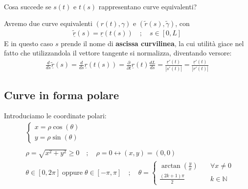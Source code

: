 Cosa succede se $s(t)$ e $t(s)$ rappresentano curve equivalenti?

Avremo due curve equivalenti $(r(t),\gamma)$ e $(\tilde{r}(s),\tilde{\gamma})$, con
\begin{align}
\tilde{\underline{r}}(s)=\underline{r}(t(s)) \quad ; \quad s \in [0,L]
\end{align}
E in questo caso $s$ prende il nome di \textbf{ascissa curvilinea}, la cui utilità giace nel fatto che utilizzandola il vettore tangente si normalizza, diventando versore:
\begin{align}
\frac{d}{ds}\tilde{\underline{r}}(s)= \frac{d}{ds}\underline{r}(t(s))= \frac{\partial}{\partial t}\underline{r}(t) \frac{dL}{ds}= \frac{\underline{r}'(t)}{|s'(t)|}=\frac{\underline{r}'(t)}{|r'(t)|}
\end{align}

\subsection{Curve in forma polare}

Introduciamo le coordinate polari:
\begin{align}
{}&\left\{
\begin{array}{cc}
x=\rho \cos(\theta)\\
y=\rho \sin(\theta)
\end{array}
\right.\\
\nonumber \\
&\rho=\sqrt{x^2 + y^2} \geq 0 \quad ;\quad \rho=0\leftrightarrow (x,y)=(0,0) \\
&\theta \in [0,2\pi] \; \text{oppure} \; \theta \in [-\pi,\pi] \quad ; \quad \theta=
\left\{
\begin{array}{cc}
\arctan\left(\frac{y}{x}\right) \quad {}&\forall x \neq 0 \\
\frac{(2k+1)\pi}{2} \quad &k\in \mathbb{N} 
\end{array}
\right.
\end{align}

\begin{figure}[!htb]
\end{figure}

